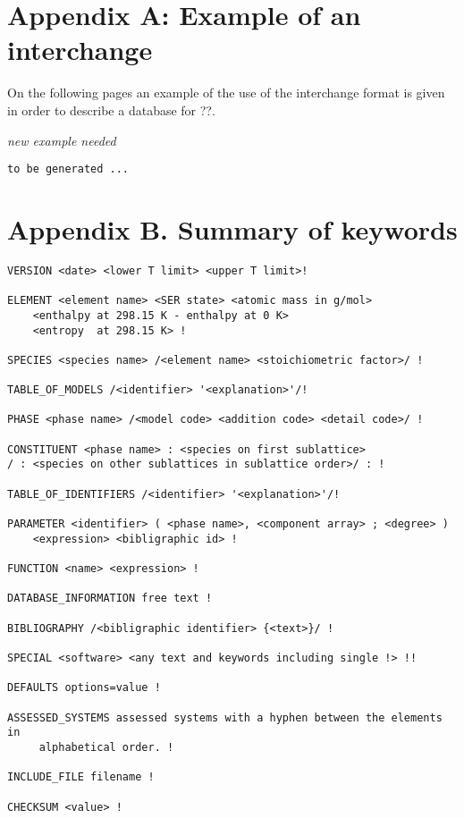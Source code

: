 \documentclass[12pt]{article}
\begin{document}
\newpage

\section{Appendix A: Example of an interchange}

On the following pages an example of the use of the interchange format
is given in order to describe a database for ??.  

{\em new example needed}

{\small
\begin{verbatim}
to be generated ...
\end{verbatim}
}

\newpage

\section{Appendix B.  Summary of keywords}

\begin{verbatim}
VERSION <date> <lower T limit> <upper T limit>!

ELEMENT <element name> <SER state> <atomic mass in g/mol>
    <enthalpy at 298.15 K - enthalpy at 0 K>
    <entropy  at 298.15 K> !

SPECIES <species name> /<element name> <stoichiometric factor>/ !

TABLE_OF_MODELS /<identifier> '<explanation>'/!

PHASE <phase name> /<model code> <addition code> <detail code>/ !

CONSTITUENT <phase name> : <species on first sublattice> 
/ : <species on other sublattices in sublattice order>/ : !

TABLE_OF_IDENTIFIERS /<identifier> '<explanation>'/!

PARAMETER <identifier> ( <phase name>, <component array> ; <degree> )
    <expression> <bibligraphic id> !

FUNCTION <name> <expression> !

DATABASE_INFORMATION free text !

BIBLIOGRAPHY /<bibligraphic identifier> {<text>}/ !

SPECIAL <software> <any text and keywords including single !> !!

DEFAULTS options=value !

ASSESSED_SYSTEMS assessed systems with a hyphen between the elements in
     alphabetical order. !

INCLUDE_FILE filename !

CHECKSUM <value> !

\end{verbatim}
\end{document}
